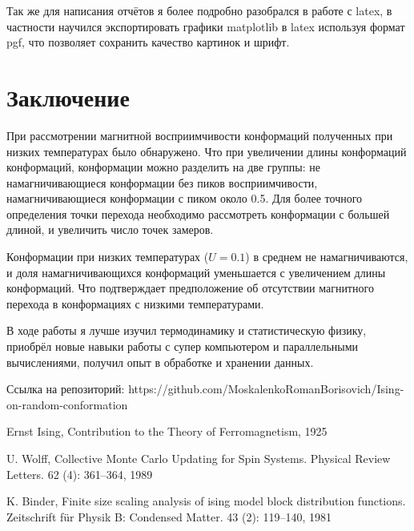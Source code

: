 \documentclass[a4paper,12pt]{article}
\begin{document}
Так же для написания отчётов я более подробно разобрался в работе с latex, в частности научился экспортировать графики matplotlib в latex используя формат pgf, что позволяет сохранить качество картинок и шрифт.

\section{Заключение}
При рассмотрении магнитной восприимчивости конформаций полученных при низких температурах было обнаружено. Что при увеличении длины конформаций конформаций, конформации можно разделить на две группы: не намагничивающиеся конформации без пиков восприимчивости, намагничивающиеся конформации с пиком около 0.5. Для более точного определения точки перехода необходимо рассмотреть конформации с большей длиной, и увеличить число точек замеров.

Конформации при низких температурах ($U=0.1$) в среднем не намагничиваются, и доля намагничивающихся конформаций уменьшается с увеличением длины конформаций. Что подтверждает предположение об отсутствии магнитного перехода в конформациях с низкими температурами. 

В ходе работы я лучше изучил термодинамику и статистическую физику, приобрёл новые навыки работы с супер компьютером и параллельными вычислениями, получил опыт в обработке и хранении данных.


\begin{thebibliography}{9}
 Ссылка на репозиторий: https://github.com/MoskalenkoRomanBorisovich/Ising-on-random-conformation 
 
Ernst Ising, Contribution to the Theory of Ferromagnetism, 1925


 U. Wolff, Collective Monte Carlo Updating for Spin Systems. Physical Review Letters. 62 (4): 361–364, 1989
 
 K. Binder, Finite size scaling analysis of ising model block distribution functions. Zeitschrift für Physik B: Condensed Matter. 43 (2): 119–140, 1981

\end{thebibliography}
\end{document}

